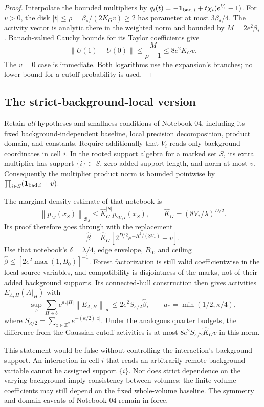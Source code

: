 \documentclass[11pt]{article}
\theoremstyle{remark}
\newcommand{\norm}[1]{\left\|#1\right\|}
\begin{document}
\begin{proof}
Interpolate the bounded multipliers by
$q_i(t)=-\mathbf1_{{\rm bad},i}+t\chi_i(e^{V_i}-1)$.
For $v>0$, the disk $|t|\le\rho=\beta_*/(2K_Gv)\ge2$ has
parameter at most $3\beta_*/4$. The activity vector is analytic
there in the weighted norm and bounded by $M=2e^2\beta_*$.
Banach-valued Cauchy bounds for its Taylor coefficients give
\[
 \norm{U(1)-U(0)}\le\frac{M}{\rho-1}
                  \le8e^2K_Gv.
\]
The $v=0$ case is immediate. Both logarithms use the expansion's
branches; no lower bound for a cutoff probability is used.
\end{proof}

\subsection{The strict-background-local version}

Retain \emph{all} hypotheses and smallness conditions of Notebook 04,
including its fixed background-independent baseline, local precision
decomposition, product domain, and constants. Require additionally
that $V_i$ reads only background coordinates in cell $i$.
In the rooted support algebra for a marked set $S$, its extra multiplier
has support $\{i\}\subset S$, zero added support length, and norm at
most $v$. Consequently the multiplier product norm is bounded pointwise
by $\prod_{i\in S}(\mathbf1_{{\rm bad},i}+v)$.

The marginal-density estimate of that notebook is
\[
 \norm{p_M(x_S)}_{\mathcal B_S}
 \le\widehat K_G^{|S|}p_{2V_*I}(x_S),\qquad
 \widehat K_G=(8V_*/\lambda)^{D/2}.
\]
Its proof therefore goes through with the replacement
\[
 \widehat\beta=\widehat K_G
        [2^{D/2}e^{-R^2/(8V_*)}+v].
\]
Use that notebook's $\delta=\lambda/4$, edge envelope, $B_0$, and
ceiling $\widehat\beta\le[2e^2\max(1,B_0)]^{-1}$.
Forest factorization is still valid coefficientwise in the local
source variables, and compatibility is disjointness of the marks,
not of their added background supports. Its connected-hull construction
then gives activities $E_{\Lambda,H}(A|_H)$ with
\[
 \sup_b\sum_{H\ni b}e^{a_*|H|}\norm{E_{\Lambda,H}}_\infty
 \le2e^2S_{\kappa/2}\widehat\beta,
 \qquad a_*=\min(1/2,\kappa/4),
\]
where $S_{\kappa/2}=\sum_{z\in\mathbb Z^d}e^{-(\kappa/2)|z|}$.
Under the analogous quarter budgets, the difference from the
Gaussian-cutoff activities is at most
$8e^2S_{\kappa/2}\widehat K_Gv$ in this norm.

This statement would be false without controlling the interaction's
background support. An interaction in cell $i$ that reads an arbitrarily
remote background variable cannot be assigned support $\{i\}$.
Nor does strict dependence on the varying background imply consistency
between volumes: the finite-volume coefficients may still depend on
the fixed whole-volume baseline. The symmetry and domain caveats of
Notebook 04 remain in force.
\end{document}
